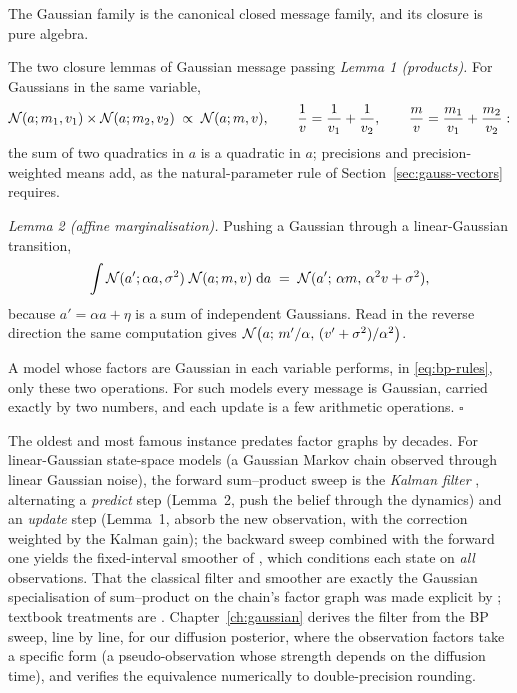 The Gaussian family is the canonical closed message family, and its
closure is pure algebra.

\begin{toolbox}[tb:closure]{The two closure lemmas of Gaussian message passing}
\emph{Lemma 1 (products).} For Gaussians in the same variable,
\begin{equation*}
  \mathcal{N}(a; m_1, v_1) \times \mathcal{N}(a; m_2, v_2)
  \;\propto\; \mathcal{N}(a; m, v),
  \qquad
  \frac{1}{v} = \frac{1}{v_1} + \frac{1}{v_2},
  \qquad
  \frac{m}{v} = \frac{m_1}{v_1} + \frac{m_2}{v_2} :
\end{equation*}
the sum of two quadratics in $a$ is a quadratic in $a$; precisions and
precision-weighted means add, as the natural-parameter rule of
Section~\ref{sec:gauss-vectors} requires.

\emph{Lemma 2 (affine marginalisation).} Pushing a Gaussian through a
linear-Gaussian transition,
\begin{equation*}
  \int \mathcal{N}(a'; \alpha a, \sigma^2)\; \mathcal{N}(a; m, v)\; \mathrm{d} a
  \;=\; \mathcal{N}(a';\, \alpha m,\, \alpha^2 v + \sigma^2),
\end{equation*}
because $a' = \alpha a + \eta$ is a sum of independent Gaussians. Read in
the reverse direction the same computation gives
$\mathcal{N}\big(a;\, m'/\alpha,\, (v' + \sigma^2)/\alpha^2\big)$.

A model whose factors are Gaussian in each variable performs, in
\eqref{eq:bp-rules}, only these two operations. For such models every
message is Gaussian, carried exactly by two numbers, and each update is
a few arithmetic operations. \hfill$\square$
\end{toolbox}

The oldest and most famous instance predates factor graphs by decades.
For linear-Gaussian state-space models (a Gaussian Markov chain observed
through linear Gaussian noise), the forward sum--product sweep is the
\emph{Kalman filter} \citep{kalman1960new}, alternating a
\emph{predict} step (Lemma~2, push the belief through the dynamics) and
an \emph{update} step (Lemma~1, absorb the new observation, with the
correction weighted by the Kalman gain); the backward sweep combined with
the forward one yields the fixed-interval smoother of
\citet{rauch1965maximum}, which conditions each state on \emph{all}
observations. That the classical filter and smoother are exactly the
Gaussian specialisation of sum--product on the chain's factor graph was
made explicit by \citet{kschischang2001factor}; textbook treatments are
\citet{bishop2006pattern, koller2009probabilistic}.
Chapter~\ref{ch:gaussian} derives the filter from the BP sweep, line by
line, for our diffusion posterior, where the observation factors take a
specific form (a pseudo-observation whose strength depends on the
diffusion time), and verifies the equivalence numerically to
double-precision rounding.

